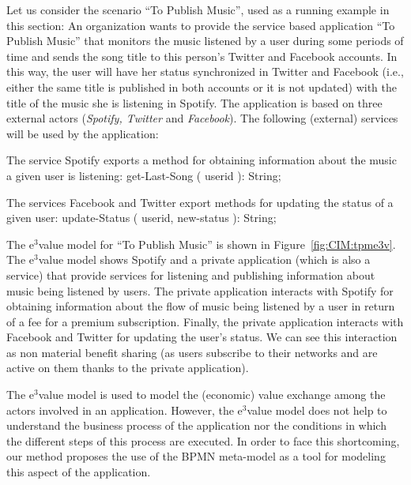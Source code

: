 \documentclass{singlecol-new}
\theoremstyle{TH}{
\newtheorem{lemma}{Lemma}
\newtheorem{theorem}[lemma]{Theorem}
\newtheorem{corrolary}[lemma]{Corrolary}
\newtheorem{conjecture}[lemma]{Conjecture}
\newtheorem{proposition}[lemma]{Proposition}
\newtheorem{claim}[lemma]{Claim}
\newtheorem{stheorem}[lemma]{Wrong Theorem}
\newtheorem{algorithm}{Algorithm}
}
\theoremstyle{THrm}{
\newtheorem{definition}{Definition}[section]
\newtheorem{question}{Question}[section]
\newtheorem{remark}{Remark}
\newtheorem{scheme}{Scheme}
}
\theoremstyle{THhit}{
\newtheorem{case}{Case}[section]
}
\theoremstyle{THhsl}{
\newtheorem{example}{Example}
}
\begin{document}
\begin{example}\label{ex:toPublicMusic}
Let us consider the scenario ``To Publish Music'', used as a running example in this section:
An organization wants to provide the service based application ``To Publish Music'' that monitors the music listened by a user during some periods of time and sends the song title  to this person's Twitter and Facebook accounts.
In this way, the user will have her status synchronized in  Twitter and Facebook (i.e., either the same title is published in both accounts or it is not updated) with the title of the music she is listening in Spotify.
The application is based on three external actors ({\em Spotify, Twitter} and {\em Facebook}).
The following (external) services will be used by the application:

\begin{compactitem}
\item The  service   Spotify exports a meth\-od for obtaining information  about the music a given user is listening:
 {\sf\small get-Last-Song ( userid ): String}; 
\item The services Facebook and Twitter export meth\-ods for  updating the status of a given user:
 {\sf\small update-Status ( userid, new-status ): String};
\end{compactitem}




The e$^3$value model for ``To Publish Music'' is shown in Figure~\ref{fig:CIM:tpme3v}.
The e$^3${value model} shows Spotify and a private application (which is also a service) that provide services for listening and publishing information about music being listened by users. 
The private application interacts with Spotify for obtaining information about the flow of music being listened by a user in return of a fee for a premium subscription. 
Finally, the private application interacts with Facebook and Twitter for updating the user's status.
We can see this interaction as non material benefit sharing (as users subscribe to their networks and are active on them thanks to the private application).
\end{example}

The e$^3$value  model is used to model the (economic) value exchange among the actors involved in an application.
However, the e$^3$val\-ue model does not help to understand the business process of the application nor the conditions in which the different steps of this process are executed.
In order to face this shortcoming, our method proposes the use of the BPMN meta-model as a tool for modeling this aspect of the application.
\end{document}
